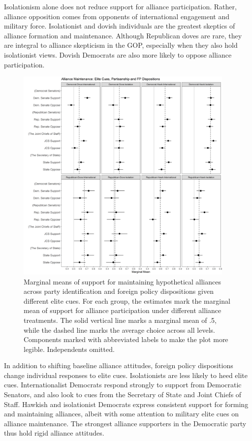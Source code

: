 \documentclass[12pt]{article}
\begin{document}
Isolationism alone does not reduce support for alliance participation.
Rather, alliance opposition comes from opponents of international engagement and military force. 
Isolationist and dovish individuals are the greatest skeptics of alliance formation and maintenance. 
Although Republican doves are rare, they are integral to alliance skepticism in the GOP, especially when they also hold isolationist views.
Dovish Democrats are also more likely to oppose alliance participation.  


\begin{figure}
	\centering
		\includegraphics[width=0.95\textwidth]{../figures/party-dispo-main-el.png}
	\caption{Marginal means of support for maintaining hypothetical alliances across party identification and foreign policy dispositions given different elite cues. For each group, the estimates mark the marginal mean of support for alliance participation under different alliance treatments. The solid vertical line marks a marginal mean of .5, while the dashed line marks the average choice across all levels. Components marked with abbreviated labels to make the plot more legible. Independents omitted.}
	\label{fig:party-dispo-main-el}
\end{figure}


In addition to shifting baseline alliance attitudes, foreign policy dispositions change individual responses to elite cues. 
Isolationists are less likely to heed elite cues. 
Internationalist Democrats respond strongly to support from Democratic Senators, and also look to cues from the Secretary of State and Joint Chiefs of Staff. 
Hawkish and isolationist Democrats express consistent support for forming and maintaining alliances, albeit with some attention to military elite cues on alliance maintenance. 
The strongest alliance supporters in the Democratic party thus hold rigid alliance attitudes.
\end{document}
